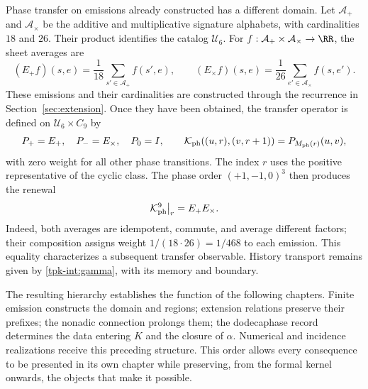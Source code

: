 Phase transfer on emissions already constructed has a different domain.
Let \(\mathcal A_+\) and \(\mathcal A_\times\) be the
additive and multiplicative signature alphabets, with cardinalities
\(18\) and \(26\). Their product identifies the catalog \(\mathcal U_6\).
For \(f:\mathcal A_+\times\mathcal A_\times\to\RR\),
the sheet averages are
\[
 (E_+f)(s,e)=\frac1{18}\sum_{s'\in\mathcal A_+}f(s',e),\qquad
 (E_\times f)(s,e)=\frac1{26}\sum_{e'\in\mathcal A_\times}f(s,e').
\]
These emissions and their cardinalities are constructed through the
recurrence in Section~\ref{sec:extension}. Once they have been obtained,
the transfer operator is defined on
\(\mathcal U_6\times C_9\) by
\[
 P_+=E_+,\quad P_-=E_\times,\quad P_0=I,\qquad
 \mathcal K_{\rm ph}((u,r),(v,r+1))=P_{M_{\rm ph}(r)}(u,v),
\]
with zero weight for all other phase transitions. The index
\(r\) uses the positive representative of the cyclic class.
The phase order \((+1,-1,0)^3\) then produces the renewal
\[
 \mathcal K_{\rm ph}^{9}\big|_r=E_+E_\times.
\]
Indeed, both averages are idempotent, commute, and average different
factors; their composition assigns weight \(1/(18\cdot26)=1/468\)
to each emission. This equality characterizes a subsequent transfer
observable. History transport remains given by \eqref{tpk-int:gamma},
with its memory and boundary.

The resulting hierarchy establishes the function of the following chapters.
Finite emission constructs the domain and regions; extension relations
preserve their prefixes; the nonadic connection prolongs them; the
dodecaphase record determines the data entering \(K\) and the
closure of \(\alpha\). Numerical and incidence realizations receive
this preceding structure. This order allows every consequence to be
presented in its own chapter while preserving, from the formal kernel
onwards, the objects that make it possible.
